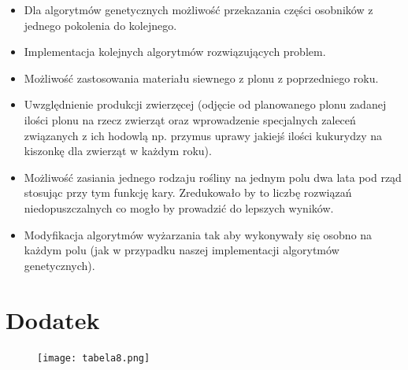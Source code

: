 \documentclass{article}
\begin{document}
\begin{itemize}
		\item Dla algorytmów genetycznych możliwość przekazania części osobników z jednego pokolenia do kolejnego.
            \item Implementacja kolejnych algorytmów rozwiązujących problem.
            \item Możliwość zastosowania materiału siewnego z plonu z poprzedniego roku.
            \item Uwzględnienie produkcji zwierzęcej (odjęcie od planowanego plonu zadanej ilości plonu na rzecz zwierząt oraz wprowadzenie specjalnych zaleceń związanych z ich hodowlą np. przymus uprawy jakiejś ilości kukurydzy na kiszonkę dla zwierząt w każdym roku).
            \item Możliwość zasiania jednego rodzaju rośliny na jednym polu dwa lata pod rząd stosując przy tym funkcję kary. Zredukowało by to liczbę rozwiązań niedopuszczalnych co mogło by prowadzić do lepszych wyników.
            \item Modyfikacja algorytmów wyżarzania tak aby wykonywały się osobno na każdym polu (jak w przypadku naszej implementacji algorytmów genetycznych).

	\end{itemize}
\section{Dodatek}

\begin{figure}[H]
	\centering
	\texttt{[image: tabela8.png]}
	\label{fig:podzialpracy}
\end{figure}
\end{document}
